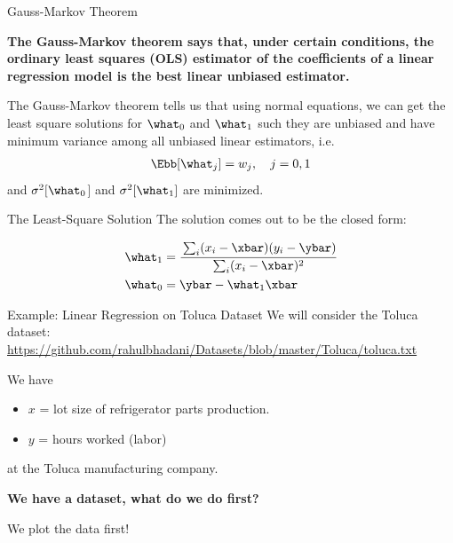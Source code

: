 \documentclass[aspectratio=169,xcolor=dvipsnames,svgnames,x11names,fleqn]{beamer}
\begin{document}
\begin{frame}{Gauss-Markov Theorem}
    \begin{center}
       \textbf{ The Gauss-Markov theorem says that, under certain conditions, the ordinary least squares (OLS) estimator of the coefficients of a linear regression model is the best linear unbiased estimator.}
    \end{center}
    The Gauss-Markov theorem tells us that using normal equations, we can get the least square solutions for $\what_0$ and $\what_1$ such they are unbiased and have minimum variance among all unbiased linear estimators, i.e.
    \begin{equation}
        \begin{aligned}
            \Ebb[\what_j] = w_j, \quad j = 0, 1
        \end{aligned}
    \end{equation}
    and $\sigma^2[\what_0$] and $\sigma^2[\what_1]$ are minimized.
    \end{frame}

\begin{frame}{The Least-Square Solution}
    The solution comes out to be the closed form:
    
    
    \begin{gradblock}{}
    {
    \Huge
    \begin{equation*}
    \begin{aligned}
        \what_1 & = \cfrac{\sum_i(x_i - \xbar)(y_i - \ybar)}{\sum_i (x_i - \xbar)^2}\\
        \what_0 & = \ybar - \what_1 \xbar
        \end{aligned}
    \end{equation*}
    }
    \end{gradblock}
    
    \end{frame}

\begin{frame}{Example: Linear Regression on Toluca Dataset}
    We will consider the Toluca dataset: \url{https://github.com/rahulbhadani/Datasets/blob/master/Toluca/toluca.txt}

    We have
    \begin{itemize}
        \item $x$ = lot size of refrigerator parts production.
        \item $y$ = hours worked (labor)
    \end{itemize}
    at the Toluca manufacturing company.

    \textbf{We have a dataset, what do we do first?}
    
    \vspace{10pt}
    
    \pause
    \begin{facts}{}
        \Huge
        We plot the data first!
    \end{facts}
    
\end{frame}
\end{document}
